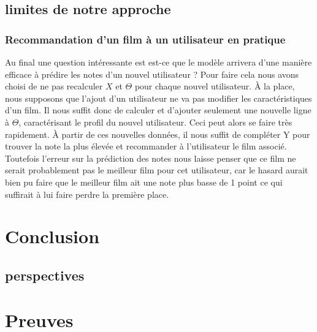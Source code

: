 \documentclass[a4paper,10pt]{article}
\begin{document}
\subsection{limites de notre approche} 
\subsubsection{Recommandation d'un film à un utilisateur en pratique}
Au final une question intéressante est est-ce que le modèle arrivera d'une manière efficace à prédire les notes d'un nouvel utilisateur ? Pour faire cela nous avons
choisi de ne pas recalculer $X$ et $\Theta$ pour chaque nouvel utilisateur. À la place, nous supposons que l'ajout d'un utilisateur ne va pas modifier
les caractéristiques d'un film. Il nous suffit donc de calculer et d'ajouter seulement une nouvelle ligne à $\Theta$, caractérisant le profil du nouvel utilisateur. Ceci peut alors se faire très rapidement. À partir de ces nouvelles données, il nous suffit de compléter Y pour trouver la note la plus élevée et recommander à l'utilisateur le film associé. 
Toutefois l'erreur sur la prédiction des notes nous laisse penser que ce film ne serait probablement pas le meilleur film pour cet utilisateur, car le hasard aurait bien pu faire que le meilleur film ait une note plus basse de 1 point ce qui suffirait à lui faire perdre la première place.

\section{Conclusion}

\subsection{perspectives}
\appendix  
\section{Preuves}  
\end{document}
